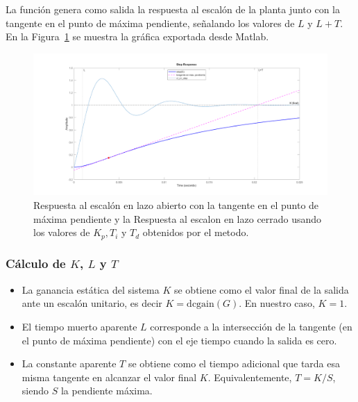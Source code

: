 La función genera como salida la respuesta al escalón de la planta junto con la tangente en el punto de máxima pendiente, señalando los valores de \(L\) y \(L+T\). En la Figura~\ref{fig:zn_step_out} se muestra la gráfica exportada desde Matlab.

\begin{figure}[!t]
	\centering
	\includegraphics[width=\columnwidth]{img/zn_step_response.png} %
	\caption{Respuesta al escalón en lazo abierto con la tangente en el punto de máxima pendiente y la Respuesta al escalon en lazo cerrado usando los valores de \(K_p,T_i\) y \(T_d\) obtenidos por el metodo.}
	\label{fig:zn_step_out}
\end{figure}

\subsubsection*{Cálculo de \(K\), \(L\) y \(T\)}
\begin{itemize}
	\item La ganancia estática del sistema \(K\) se obtiene como el valor final de la salida ante un escalón unitario, es decir \(K = \mathrm{dcgain}(G)\). En nuestro caso, \(K=1\).
	\item El tiempo muerto aparente \(L\) corresponde a la intersección de la tangente (en el punto de máxima pendiente) con el eje tiempo cuando la salida es cero.
	\item La constante aparente \(T\) se obtiene como el tiempo adicional que tarda esa misma tangente en alcanzar el valor final \(K\). Equivalentemente, \(T = K/S\), siendo \(S\) la pendiente máxima.
\end{itemize}

\begin{table}[!t]
	\centering
	\small
	\caption{Reglas de Ziegler--Nichols por respuesta al escalón.}
	\label{tab:zn_rules}
\end{table}


